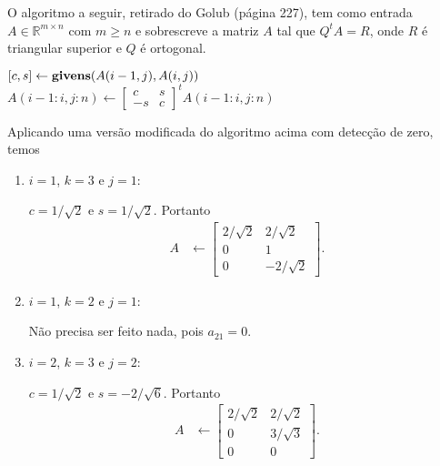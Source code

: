 \documentclass[a4paper,12pt, leqno, answers]{exam}
\begin{document}
\begin{questions}
\begin{parts}
\begin{solution}
            O algoritmo a seguir, retirado do Golub\nocite{Golub:1996:matrix} (p\'{a}gina 227), tem como entrada $A \in \mathbb{R}^{m \times n}$ com $m \geq n$ e sobrescreve a matriz $A$ tal que $Q^t A = R$, onde $R$ \'{e} triangular superior e $Q$ \'{e} ortogonal.
            \begin{algorithmic}
                        \State $[c, s] \leftarrow \text{\bf givens}(A(i - 1, j), A(i, j))$
                        \State $A(i - 1:i, j:n) \leftarrow \begin{bmatrix}
                            c & s \\
                            -s & c
                        \end{bmatrix}^t A(i - 1:i, j:n)$
                    \EndFor
                \EndFor
            \end{algorithmic}

            Aplicando uma vers\~{a}o modificada do algoritmo acima com detec\c{c}\~{a}o de zero, temos
            \begin{enumerate}
                \item $i = 1$, $k = 3$ e $j = 1$:

                    $c = 1 / \sqrt{2}$ e $s = 1 / \sqrt{2}$. Portanto
                    \begin{align*}
                        A &\leftarrow \begin{bmatrix}
                            2 / \sqrt{2} & 2 / \sqrt{2} \\
                            0 & 1 \\
                            0 & - 2 / \sqrt{2}
                        \end{bmatrix}.
                    \end{align*}
                    
                \item $i = 1$, $k = 2$ e $j = 1$:

                    N\~{a}o precisa ser feito nada, pois $a_{21} = 0$.

                \item $i = 2$, $k = 3$ e $j = 2$:

                    $c = 1 / \sqrt{2}$ e $s = -2 / \sqrt{6}$. Portanto
                    \begin{align*}
                        A &\leftarrow \begin{bmatrix}
                            2 / \sqrt{2} & 2 / \sqrt{2} \\
                            0 & 3 / \sqrt{3} \\
                            0 & 0
                        \end{bmatrix}.
                    \end{align*}
            \end{enumerate}
        \end{solution}


\end{parts}
\end{questions}
\end{document}
